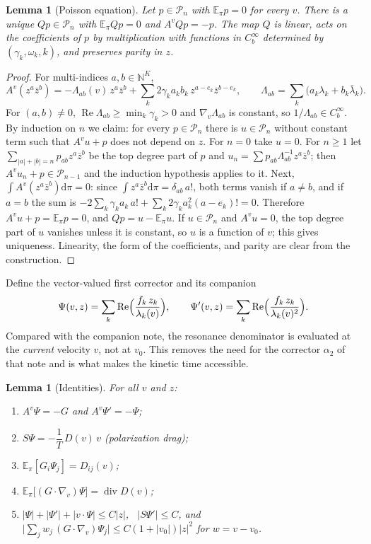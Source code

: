 \documentclass[11pt]{article}
\newcommand{\dd}{\mathrm{d}}
\newcommand{\E}{\mathbb{E}}
\newcommand{\cP}{\mathcal{P}}
\renewcommand{\Re}{\operatorname{Re}}
\newcommand{\Div}{\operatorname{div}}
\newtheorem{lemma}[theorem]{Lemma}
\theoremstyle{remark}
\begin{document}
\begin{lemma}[Poisson equation]\label{lem:poisson}
Let $p\in\cP_n$ with $\E_\pi p=0$ for every $v$. There is a unique
$Qp\in\cP_n$ with $\E_\pi Qp=0$ and $A^vQp=-p$. The map $Q$ is linear, acts
on the coefficients of $p$ by multiplication with functions in $C_b^\infty$
determined by $(\gamma_k,\omega_k,k)$, and preserves parity in $z$.
\end{lemma}

\begin{proof}
For multi-indices $a,b\in\mathbb{N}^K$,
\[
  A^v(z^a\bar z^b)=-\Lambda_{ab}(v)\,z^a\bar z^b
   +\sum_k2\gamma_ka_kb_k\,z^{a-e_k}\bar z^{b-e_k},
  \qquad
  \Lambda_{ab}=\sum_k\bigl(a_k\lambda_k+b_k\bar\lambda_k\bigr).
\]
For $(a,b)\ne0$, $\Re\Lambda_{ab}\ge\min_k\gamma_k>0$ and
$\nabla_v\Lambda_{ab}$ is constant, so $1/\Lambda_{ab}\in C_b^\infty$. By
induction on $n$ we claim: for every $p\in\cP_n$ there is $u\in\cP_n$
without constant term such that $A^vu+p$ does not depend on $z$. For $n=0$
take $u=0$. For $n\ge1$ let $\sum_{|a|+|b|=n}p_{ab}z^a\bar z^b$ be the top
degree part of $p$ and $u_n=\sum p_{ab}\Lambda_{ab}^{-1}z^a\bar z^b$; then
$A^vu_n+p\in\cP_{n-1}$ and the induction hypothesis applies to it. Next,
$\int A^v(z^a\bar z^b)\dd\pi=0$: since
$\int z^a\bar z^b\dd\pi=\delta_{ab}\,a!$, both terms vanish if $a\ne b$, and
if $a=b$ the sum is $-2\sum_k\gamma_ka_k\,a!+\sum_k2\gamma_ka_k^2(a-e_k)!=0$.
Therefore $A^vu+p=\E_\pi p=0$, and $Qp=u-\E_\pi u$. If $u\in\cP_n$ and
$A^vu=0$, the top degree part of $u$ vanishes unless it is constant, so $u$
is a function of $v$; this gives uniqueness. Linearity, the form of the
coefficients, and parity are clear from the construction.
\end{proof}

Define the vector-valued first corrector and its companion
\begin{equation}
  \Psi(v,z)=\sum_k\Re\Bigl(\frac{f_k\,z_k}{\lambda_k(v)}\Bigr),\qquad
  \Psi'(v,z)=\sum_k\Re\Bigl(\frac{f_k\,z_k}{\lambda_k(v)^2}\Bigr).
  \label{eq:Psi}
\end{equation}
Compared with the companion note, the resonance denominator is evaluated at
the \emph{current} velocity $v$, not at $v_0$. This removes the need for the
corrector $\alpha_2$ of that note and is what makes the kinetic time
accessible.

\begin{lemma}[Identities]\label{lem:id}
For all $v$ and $z$:
\begin{enumerate}
  \item[(a)] $A^v\Psi=-G$ and $A^v\Psi'=-\Psi$;
  \item[(b)] $S\Psi=-\dfrac1T\,D(v)\,v$ \quad(polarization drag);
  \item[(c)] $\E_\pi[G_i\Psi_j]=D_{ij}(v)$;
  \item[(d)] $\E_\pi\bigl[(G\cdot\nabla_v)\Psi\bigr]=\Div D(v)$;
  \item[(e)] $|\Psi|+|\Psi'|+|v\cdot\Psi|\le C|z|$, \
    $|S\Psi'|\le C$, and
    $\bigl|\sum_jw_j\,(G\cdot\nabla_v)\Psi_j\bigr|\le C(1+|v_0|)|z|^2$ for
    $w=v-v_0$.
\end{enumerate}
\end{lemma}
\end{document}
